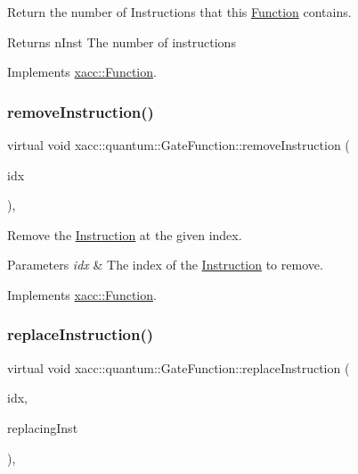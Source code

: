 Return the number of Instructions that this \hyperlink{a02456}{Function} contains.

\begin{DoxyReturn}{Returns}
n\+Inst The number of instructions 
\end{DoxyReturn}


Implements \hyperlink{a02456_a8901985525f59713e14c61713e07c086}{xacc\+::\+Function}.

\mbox{\label{a01272_a44ca35d081577de9ad2930f93c01e89d}} 
\subsubsection{\texorpdfstring{remove\+Instruction()}{removeInstruction()}}
{\footnotesize\ttfamily virtual void xacc\+::quantum\+::\+Gate\+Function\+::remove\+Instruction (\begin{DoxyParamCaption}\item[{const int}]{idx }\end{DoxyParamCaption})\hspace{0.3cm}{\ttfamily [inline]}, {\ttfamily [virtual]}}

Remove the \hyperlink{a02460}{Instruction} at the given index.


\begin{DoxyParams}{Parameters}
{\em idx} & The index of the \hyperlink{a02460}{Instruction} to remove. \\
\hline
\end{DoxyParams}


Implements \hyperlink{a02456_ab6478b09bb28e194bb555b3180737733}{xacc\+::\+Function}.

\mbox{\label{a01272_a182fdfabbf546ae89e4f2384bafb45c9}} 
\subsubsection{\texorpdfstring{replace\+Instruction()}{replaceInstruction()}}
{\footnotesize\ttfamily virtual void xacc\+::quantum\+::\+Gate\+Function\+::replace\+Instruction (\begin{DoxyParamCaption}\item[{const int}]{idx,  }\item[{Inst\+Ptr}]{replacing\+Inst }\end{DoxyParamCaption})\hspace{0.3cm}{\ttfamily [inline]}, {\ttfamily [virtual]}}

